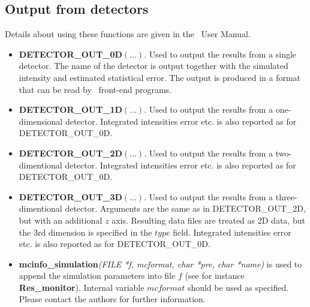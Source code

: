 \subsection{Output from detectors}
Details about using these functions are given in the \MCX\ User Manual.
\begin{itemize}
\item {\bfseries DETECTOR\_OUT\_0D}$(...)$. Used to output the results from a
  single detector. The name of the detector is output together
  with the simulated intensity and estimated statistical error. The
  output is produced in a format that can be read by \MCX\ front-end
  programs.
\item {\bfseries DETECTOR\_OUT\_1D}$(...)$. Used to output the results from a
  one-dimensional detector. Integrated intensities error etc. is also
  reported as for DETECTOR\_OUT\_0D.
\item {\bfseries DETECTOR\_OUT\_2D}$(...)$. Used to output the results from a
  two-dimentional detector. Integrated intensities error etc. is also
  reported as for DETECTOR\_OUT\_0D.
\item {\bfseries DETECTOR\_OUT\_3D}$(...)$. Used to output
  the results from a three-dimentional detector. Arguments are the same as
  in DETECTOR\_OUT\_2D, but with an additional $z$ axis.
  Resulting data files are treated as 2D data, but the 3rd dimension is
  specified in the $type$ field. Integrated intensities error etc. is also
  reported as for DETECTOR\_OUT\_0D.
\item {\bfseries mcinfo\_simulation}\textit{(FILE *f, mcformat,
  char *pre, char *name)} is used to append the simulation parameters into file $f$
  (see for instance {\bfseries Res\_monitor}).
  Internal variable $mcformat$ should be used as specified.
  Please contact the authors for further information.
\end{itemize}

